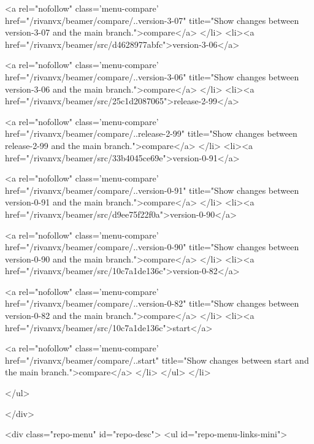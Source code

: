             
              <a rel="nofollow" class='menu-compare'
                 href="/rivanvx/beamer/compare/..version-3-07"
                 title="Show changes between version-3-07 and the main branch.">compare</a>
            </li>
          <li><a href="/rivanvx/beamer/src/d4628977abfc">version-3-06</a>
            
            
              <a rel="nofollow" class='menu-compare'
                 href="/rivanvx/beamer/compare/..version-3-06"
                 title="Show changes between version-3-06 and the main branch.">compare</a>
            </li>
          <li><a href="/rivanvx/beamer/src/25c1d2087065">release-2-99</a>
            
            
              <a rel="nofollow" class='menu-compare'
                 href="/rivanvx/beamer/compare/..release-2-99"
                 title="Show changes between release-2-99 and the main branch.">compare</a>
            </li>
          <li><a href="/rivanvx/beamer/src/33b4045ce69e">version-0-91</a>
            
            
              <a rel="nofollow" class='menu-compare'
                 href="/rivanvx/beamer/compare/..version-0-91"
                 title="Show changes between version-0-91 and the main branch.">compare</a>
            </li>
          <li><a href="/rivanvx/beamer/src/d9ee75f22f0a">version-0-90</a>
            
            
              <a rel="nofollow" class='menu-compare'
                 href="/rivanvx/beamer/compare/..version-0-90"
                 title="Show changes between version-0-90 and the main branch.">compare</a>
            </li>
          <li><a href="/rivanvx/beamer/src/10c7a1de136c">version-0-82</a>
            
            
              <a rel="nofollow" class='menu-compare'
                 href="/rivanvx/beamer/compare/..version-0-82"
                 title="Show changes between version-0-82 and the main branch.">compare</a>
            </li>
          <li><a href="/rivanvx/beamer/src/10c7a1de136c">start</a>
            
            
              <a rel="nofollow" class='menu-compare'
                 href="/rivanvx/beamer/compare/..start"
                 title="Show changes between start and the main branch.">compare</a>
            </li>
        </ul>
      </li>
     
     
    </ul>
  
</div>

<div class="repo-menu" id="repo-desc">
    <ul id="repo-menu-links-mini">
      


